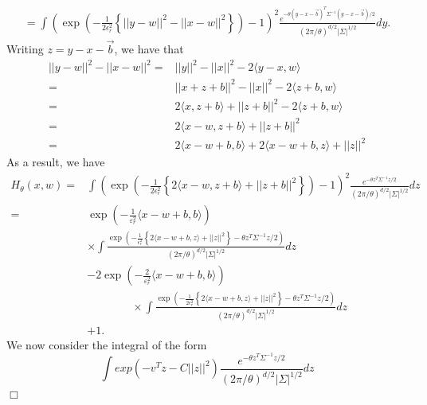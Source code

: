 \documentclass[12pt]{article}
\newenvironment {proof}{{\noindent\bf Proof }}{\hfill $\Box$ \medskip}
\newcommand{\meanq}{\vec b}    %
\newcommand{\covq}{\Sigma}     %
\begin{document}
\begin{proof}
\begin{align}
=
\int
    \left(
        \exp\left(
            - \frac{1}{2\epsilon_r^2}
            \left\{
                ||y - w||^2 - ||x - w||^2
            \right\}
        \right)
        -
        1
    \right)^2
    \frac{
        e^{-\theta (y - x-\meanq)^{T}\covq^{-1}(y - x-\meanq)  / 2}
    }{
        (2 \pi/ \theta)^{d/2} |\covq|^{1/2}
    }
dy.
\end{align}
Writing $z=y-x-\meanq$, we have that 
\begin{equation}
\begin{aligned}
||y - w||^2 - ||x - w||^2 
=& ||y||^2-||x||^2 -2\langle y-x, w\rangle \\
=&||x+z+b||^2-||x||^2-2 \langle z+b, w\rangle\\
=&2\langle x, z+b \rangle + ||z+b||^2-2 \langle z+b, w\rangle \\
=& 2 \langle x-w, z+b \rangle + ||z+b||^2\\
=& 2\langle x-w+b, b \rangle + 2\langle x-w+b, z \rangle +||z||^2
\end{aligned}
\end{equation}
As a result, we have 
\begin{align}
H_\theta(x, w)
=&
\int
    \left(
        \exp\left(
            - \frac{1}{2\epsilon_r^2}
            \left\{
                2 \langle x-w, z+b \rangle + ||z+b||^2
            \right\}
        \right)
        -
        1
    \right)^2
    \frac{
        e^{-\theta z^{T}\covq^{-1}z  / 2}
    }{
        (2 \pi/ \theta)^{d/2} |\covq|^{1/2}
    }
dz\\
=&\exp\left(-\frac{1}{\varepsilon_r^2}\langle x-w+b,b \rangle \right)\\
& \times \int
        \frac{
        \exp\left(
            - \frac{1}{\epsilon_r^2}
            \left\{
                2 \langle x-w+b, z \rangle + ||z||^2
            \right\}
            -\theta z^{T}\covq^{-1}z  / 2
        \right)
    }{
        (2 \pi/ \theta)^{d/2} |\covq|^{1/2}
    }
dz\\
&-2\exp\left(-\frac{2}{\varepsilon_r^2}\langle x-w+b,b \rangle \right)\\
& \qquad \qquad \times     \int
    \frac{ \exp\left(
            - \frac{1}{2\epsilon_r^2}
            \left\{
                2 \langle x-w+b, z \rangle + ||z||^2
            \right\} 
            -\theta z^{T}\covq^{-1}z  / 2
        \right)
        }{
        (2 \pi/ \theta)^{d/2} |\covq|^{1/2}
    }
dz\\
&+1.
\end{align}
We now consider the integral of the form 
\begin{equation}
\int exp(-v^{T}z-C||z||^2) \frac{
        e^{-\theta z^{T}\covq^{-1}z  / 2}
    }{
        (2 \pi/ \theta)^{d/2} |\covq|^{1/2}
    }
dz   
\end{equation}
\end{proof}
\end{document}
